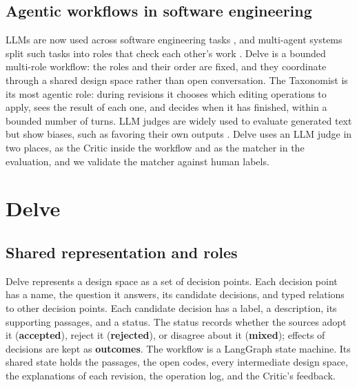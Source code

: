 \documentclass[conference]{IEEEtran}
\begin{document}
\subsection{Agentic workflows in software engineering}

LLMs are now used across software engineering tasks \cite{llm4se}, and multi-agent systems split such tasks into roles that check each other's work \cite{lma}. Delve is a bounded multi-role workflow: the roles and their order are fixed, and they coordinate through a shared design space rather than open conversation. The Taxonomist is its most agentic role: during revisions it chooses which editing operations to apply, sees the result of each one, and decides when it has finished, within a bounded number of turns. LLM judges are widely used to evaluate generated text but show biases, such as favoring their own outputs \cite{judge}. Delve uses an LLM judge in two places, as the Critic inside the workflow and as the matcher in the evaluation, and we validate the matcher against human labels.

\section{Delve}

\subsection{Shared representation and roles}

Delve represents a design space as a set of decision points. Each decision point has a name, the question it answers, its candidate decisions, and typed relations to other decision points. Each candidate decision has a label, a description, its supporting passages, and a status. The status records whether the sources adopt it (\textbf{accepted}), reject it (\textbf{rejected}), or disagree about it (\textbf{mixed}); effects of decisions are kept as \textbf{outcomes}. The workflow is a LangGraph state machine. Its shared state holds the passages, the open codes, every intermediate design space, the explanations of each revision, the operation log, and the Critic's feedback.
\end{document}

